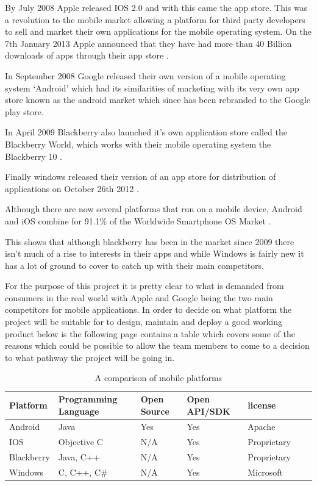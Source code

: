 By July 2008 Apple released IOS 2.0 and with this came the app store. This was a revolution to the mobile market allowing a platform for third party developers to sell and market their own applications for the mobile operating system. On the 7th January 2013 Apple announced that they have had more than 40 Billion downloads of apps through their app store \citep{40billion12}.

In September 2008 Google released their own version of a mobile operating system ‘Android’ which had its similarities of marketing with its very own app store known as the android market which since has been rebranded to the Google play store. 

In April 2009 Blackberry also launched it’s own application store called the Blackberry World, which works with their mobile operating system the Blackberry 10 \citep{bbworld09}.

Finally windows released their version of an app store for distribution of applications on October 26th 2012 \citep{windows8}.

Although there are now several platforms that run on a mobile device, Android and iOS combine for 91.1\% of the Worldwide Smartphone OS Market \citep{idc13}.

This shows that although blackberry has been in the market since 2009 there isn’t much of a rise to interests in their apps and while Windows is fairly new it has a lot of ground to cover to catch up with their main competitors.

For the purpose of this project it is pretty clear to what is demanded from consumers in the real world with Apple and Google being the two main competitors for mobile applications. In order to decide on what platform the project will be suitable for to design, maintain and deploy a good working product below is the following page contains a table which covers some of the reasons which could be possible to allow the team members to come to a decision to what pathway the project will be going in.

\newpage
\begin{table}[!ht]
    \begin{tabular}{|l|l|l|l|l|l|l|}
    \hline
                      Platform & Programming Language & Open Source & Open API/SDK & license \\ \hline
    Android                    & Java                 & Yes         & Yes          & Apache \\ \hline
    IOS                        & Objective C          & N/A         & Yes          & Proprietary    \\ \hline
    Blackberry                 & Java, C++            & N/A         & Yes          & Proprietary    \\ \hline
    Windows                    & C, C++, C\#           & N/A         & Yes          & Microsoft \\ \hline
    \end{tabular}
    \caption {A comparison of mobile platforms}
\end{table}


